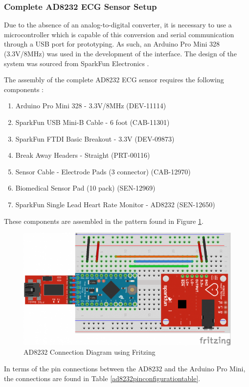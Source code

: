\subsubsection*{Complete AD8232 ECG Sensor Setup}

Due to the absence of an analog-to-digital converter, it is necessary to use a microcontroller which is capable of this conversion and serial communication through a USB port for prototyping. As such, an Arduino Pro Mini 328 (3.3V/8MHz) was used in the development of the interface. The design of the system was sourced from SparkFun Electronics \cite{ad8232}. 

The assembly of the complete AD8232 ECG sensor requires the following components \cite{ad8232}:

\begin{enumerate}
	\item Arduino Pro Mini 328 - 3.3V/8MHz (DEV-11114)
	\item SparkFun USB Mini-B Cable - 6 foot (CAB-11301)
	\item SparkFun FTDI Basic Breakout - 3.3V (DEV-09873)
	\item Break Away Headers - Straight (PRT-00116)
	\item Sensor Cable - Electrode Pads (3 connector) (CAB-12970)
	\item Biomedical Sensor Pad (10 pack) (SEN-12969) 
	\item SparkFun Single Lead Heart Rate Monitor - AD8232 (SEN-12650) 
\end{enumerate}

These components are assembled in the pattern found in Figure \ref{ad8232sffritzing}. 

\begin{figure}[H]
	\centering
	\includegraphics[width=0.5\linewidth]{ad8232fritzing.png}
	\caption{AD8232 Connection Diagram using Fritzing \cite{ad8232}}
	\label{ad8232sffritzing}
\end{figure}

In terms of the pin connections between the AD8232 and the Arduino Pro Mini, the connections are found in Table \ref{ad8232pinconfigurationtable}.

